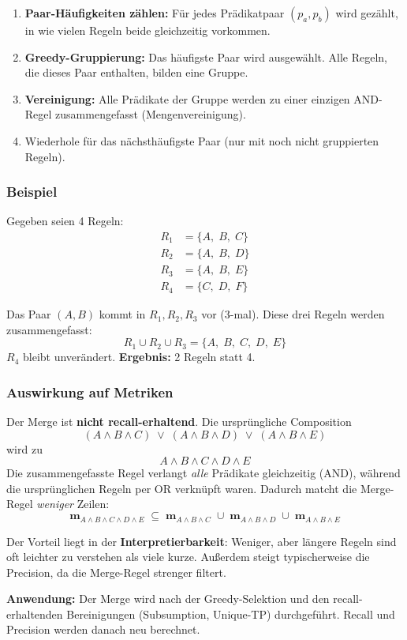 \documentclass[11pt,a4paper]{article}
\begin{document}
\begin{enumerate}[nosep]
  \item \textbf{Paar-H\"aufigkeiten z\"ahlen:} F\"ur jedes Pr\"adikatpaar $(p_a, p_b)$ wird gez\"ahlt, in wie vielen Regeln beide gleichzeitig vorkommen.
  \item \textbf{Greedy-Gruppierung:} Das h\"aufigste Paar wird ausgew\"ahlt. Alle Regeln, die dieses Paar enthalten, bilden eine Gruppe.
  \item \textbf{Vereinigung:} Alle Pr\"adikate der Gruppe werden zu einer einzigen AND-Regel zusammengefasst (Mengenvereinigung).
  \item Wiederhole f\"ur das n\"achsth\"aufigste Paar (nur mit noch nicht gruppierten Regeln).
\end{enumerate}

\subsubsection{Beispiel}

Gegeben seien 4 Regeln:
\begin{align*}
  R_1 &= \{A,\; B,\; C\} \\
  R_2 &= \{A,\; B,\; D\} \\
  R_3 &= \{A,\; B,\; E\} \\
  R_4 &= \{C,\; D,\; F\}
\end{align*}

\noindent Das Paar $(A, B)$ kommt in $R_1, R_2, R_3$ vor (3-mal). Diese drei Regeln werden zusammengefasst:
\[
  R_1 \cup R_2 \cup R_3 = \{A,\; B,\; C,\; D,\; E\}
\]
$R_4$ bleibt unver\"andert. \textbf{Ergebnis:} 2 Regeln statt 4.

\subsubsection{Auswirkung auf Metriken}

Der Merge ist \textbf{nicht recall-erhaltend}. Die urspr\"ungliche Composition
\[
  (A \land B \land C) \;\lor\; (A \land B \land D) \;\lor\; (A \land B \land E)
\]
wird zu
\[
  A \land B \land C \land D \land E
\]
Die zusammengefasste Regel verlangt \emph{alle} Pr\"adikate gleichzeitig (AND), w\"ahrend die urspr\"unglichen Regeln per OR verkn\"upft waren. Dadurch matcht die Merge-Regel \emph{weniger} Zeilen:
\[
  \mathbf{m}_{A \land B \land C \land D \land E} \;\subseteq\; \mathbf{m}_{A \land B \land C} \;\cup\; \mathbf{m}_{A \land B \land D} \;\cup\; \mathbf{m}_{A \land B \land E}
\]

\noindent Der Vorteil liegt in der \textbf{Interpretierbarkeit}: Weniger, aber l\"angere Regeln sind oft leichter zu verstehen als viele kurze. Au\ss erdem steigt typischerweise die Precision, da die Merge-Regel strenger filtert.

\medskip
\noindent\textbf{Anwendung:} Der Merge wird nach der Greedy-Selektion und den recall-erhaltenden Bereinigungen (Subsumption, Unique-TP) durchgef\"uhrt. Recall und Precision werden danach neu berechnet.
\end{document}
